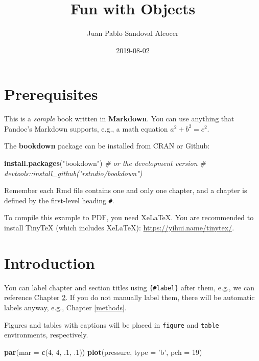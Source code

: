 \documentclass[]{book}
\title{Fun with Objects}
\author{Juan Pablo Sandoval Alcocer}
\date{2019-08-02}
\newenvironment{Shaded}{\begin{snugshade}}{\end{snugshade}}
\newcommand{\CommentTok}[1]{\textcolor[rgb]{0.56,0.35,0.01}{\textit{#1}}}
\newcommand{\DataTypeTok}[1]{\textcolor[rgb]{0.13,0.29,0.53}{#1}}
\newcommand{\DecValTok}[1]{\textcolor[rgb]{0.00,0.00,0.81}{#1}}
\newcommand{\FloatTok}[1]{\textcolor[rgb]{0.00,0.00,0.81}{#1}}
\newcommand{\KeywordTok}[1]{\textcolor[rgb]{0.13,0.29,0.53}{\textbf{#1}}}
\newcommand{\NormalTok}[1]{#1}
\newcommand{\StringTok}[1]{\textcolor[rgb]{0.31,0.60,0.02}{#1}}
\begin{document}
\maketitle

{
\setcounter{tocdepth}{1}
\tableofcontents
}
\hypertarget{prerequisites}{%
\chapter{Prerequisites}\label{prerequisites}}

This is a \emph{sample} book written in \textbf{Markdown}. You can use anything that Pandoc's Markdown supports, e.g., a math equation \(a^2 + b^2 = c^2\).

The \textbf{bookdown} package can be installed from CRAN or Github:

\begin{Shaded}
\begin{Highlighting}[]
\KeywordTok{install.packages}\NormalTok{(}\StringTok{"bookdown"}\NormalTok{)}
\CommentTok{# or the development version}
\CommentTok{# devtools::install_github("rstudio/bookdown")}
\end{Highlighting}
\end{Shaded}

Remember each Rmd file contains one and only one chapter, and a chapter is defined by the first-level heading \texttt{\#}.

To compile this example to PDF, you need XeLaTeX. You are recommended to install TinyTeX (which includes XeLaTeX): \url{https://yihui.name/tinytex/}.

\hypertarget{intro}{%
\chapter{Introduction}\label{intro}}

You can label chapter and section titles using \texttt{\{\#label\}} after them, e.g., we can reference Chapter \ref{intro}. If you do not manually label them, there will be automatic labels anyway, e.g., Chapter \ref{methods}.

Figures and tables with captions will be placed in \texttt{figure} and \texttt{table} environments, respectively.

\begin{Shaded}
\begin{Highlighting}[]
\KeywordTok{par}\NormalTok{(}\DataTypeTok{mar =} \KeywordTok{c}\NormalTok{(}\DecValTok{4}\NormalTok{, }\DecValTok{4}\NormalTok{, }\FloatTok{.1}\NormalTok{, }\FloatTok{.1}\NormalTok{))}
\KeywordTok{plot}\NormalTok{(pressure, }\DataTypeTok{type =} \StringTok{'b'}\NormalTok{, }\DataTypeTok{pch =} \DecValTok{19}\NormalTok{)}
\end{Highlighting}
\end{Shaded}
\end{document}

